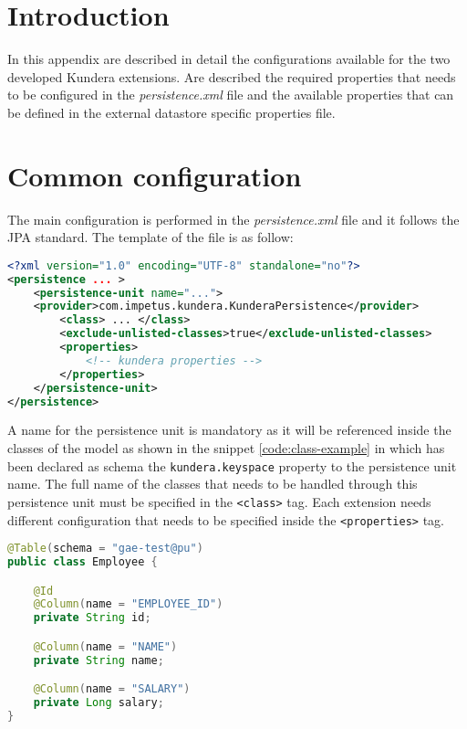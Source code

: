 \section{Introduction}
In this appendix are described in detail the configurations available for the two developed Kundera extensions. Are described the required properties that needs to be configured in the \textit{persistence.xml} file and the available properties that can be defined in the external datastore specific properties file.

\section{Common configuration}
The main configuration is performed in the \textit{persistence.xml} file and it follows the JPA standard.
The template of the file is as follow:

\begin{lstlisting}[language=XML, caption=persistence.xml template]
<?xml version="1.0" encoding="UTF-8" standalone="no"?>
<persistence ... >
    <persistence-unit name="...">
    <provider>com.impetus.kundera.KunderaPersistence</provider>
        <class> ... </class>
        <exclude-unlisted-classes>true</exclude-unlisted-classes>
        <properties>
            <!-- kundera properties -->
        </properties>
    </persistence-unit>
</persistence>
\end{lstlisting}

\noindent A name for the persistence unit is mandatory as it will be referenced inside the classes of the model as shown in the snippet \ref{code:class-example} in which has been declared as schema the \texttt{kundera.keyspace} property to the persistence unit name.
The full name of the classes that needs to be handled through this persistence unit must be specified in the \texttt{<class>} tag.
Each extension needs different configuration that needs to be specified inside the \texttt{<properties>} tag.

\begin{lstlisting}[language=Java, caption=Declaring the schema, label=code:class-example]
@Table(schema = "gae-test@pu")
public class Employee {

    @Id
    @Column(name = "EMPLOYEE_ID")
    private String id;

    @Column(name = "NAME")
    private String name;

    @Column(name = "SALARY")
    private Long salary;
}
\end{lstlisting}

